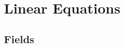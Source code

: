 \documentclass[class=linear-algebra,crop=false]{standalone}
\begin{document}
\chapter{Linear Equations}

\section{Fields}
\end{document}
